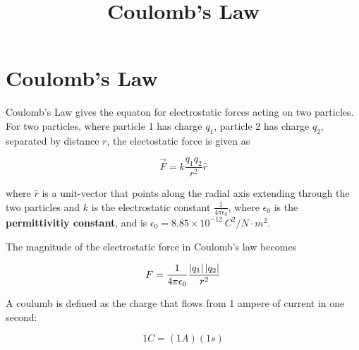 \documentclass{article}
\title{Coulomb's Law}
\begin{document}
\section{Coulomb's Law}

Coulomb's Law gives the equaton for electrostatic forces acting on two particles. For two particles, where particle 1 has charge $q_1$, particle 2 has charge $q_2$, separated by distance $r$, the electostatic force is given as

\[ \vec{F} = k \frac{q_1 q_2}{r^2} \hat{r} \]

where $\hat{r}$ is a \@{unit-vector} that points along the radial axis extending through the two particles and $k$ is the electrostatic constant $\frac{1}{4 \pi \epsilon_0}$, where $\epsilon_0$ is the \textbf{permittivitiy constant}, and is $\epsilon_0 = 8.85 \times 10^{-12} ~ C^2 / N \cdot m^2$.

The \@{magnitude} of the electrostatic force in Coulomb's law becomes

\[ F = \frac{1}{4 \pi \epsilon_0} \frac{\left| q_1 \right| \left| q_2 \right|}{r^2} \]

A coulumb is defined as the charge that flows from 1 ampere of current in one second:

\[ 1 C = (1 A)(1 s) \]
\end{document}
